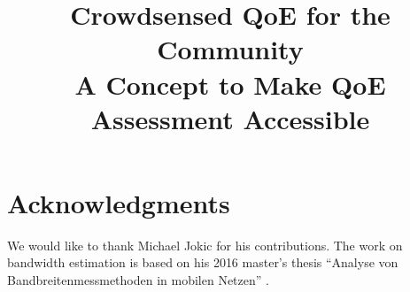 \documentclass[conference,10pt,a4paper]{IEEEtran}
\begin{document}
\title{Crowdsensed QoE for the Community \\
{\Large A Concept to Make QoE Assessment Accessible}}



\author{
}

\maketitle









\section*{Acknowledgments}
We would like to thank Michael Jokic for his contributions. The work on bandwidth estimation is based on his 2016 master's thesis ``Analyse von Bandbreitenmessmethoden in mobilen Netzen'' \cite{jokic16mobileBW}.

\balance
\printbibliography
\end{document}

